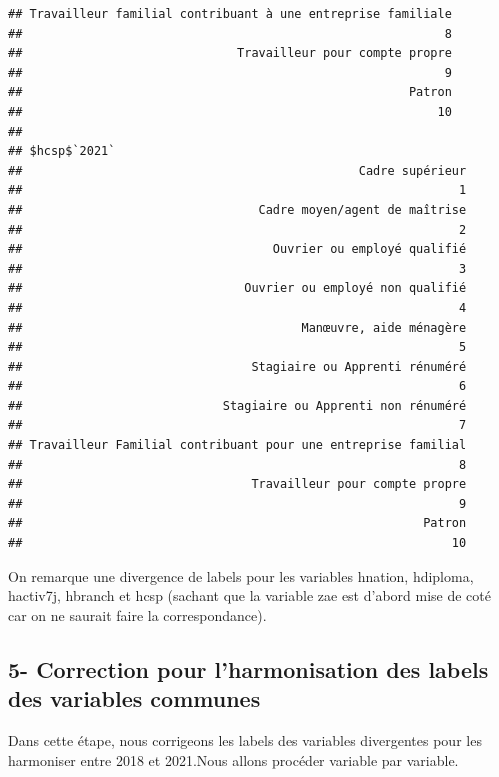 \documentclass[
]{article}
\begin{document}
\begin{verbatim}
## Travailleur familial contribuant à une entreprise familiale 
##                                                           8 
##                              Travailleur pour compte propre 
##                                                           9 
##                                                      Patron 
##                                                          10 
## 
## $hcsp$`2021`
##                                               Cadre supérieur 
##                                                             1 
##                                 Cadre moyen/agent de maîtrise 
##                                                             2 
##                                   Ouvrier ou employé qualifié 
##                                                             3 
##                               Ouvrier ou employé non qualifié 
##                                                             4 
##                                       Manœuvre, aide ménagère 
##                                                             5 
##                                Stagiaire ou Apprenti rénuméré 
##                                                             6 
##                            Stagiaire ou Apprenti non rénuméré 
##                                                             7 
## Travailleur Familial contribuant pour une entreprise familial 
##                                                             8 
##                                Travailleur pour compte propre 
##                                                             9 
##                                                        Patron 
##                                                            10
\end{verbatim}

On remarque une divergence de labels pour les variables hnation,
hdiploma, hactiv7j, hbranch et hcsp (sachant que la variable zae est
d'abord mise de coté car on ne saurait faire la correspondance).

\hypertarget{correction-pour-lharmonisation-des-labels-des-variables-communes}{%
\subsection{5- Correction pour l'harmonisation des labels des variables
communes}\label{correction-pour-lharmonisation-des-labels-des-variables-communes}}

Dans cette étape, nous corrigeons les labels des variables divergentes
pour les harmoniser entre 2018 et 2021.Nous allons procéder variable par
variable.
\end{document}

